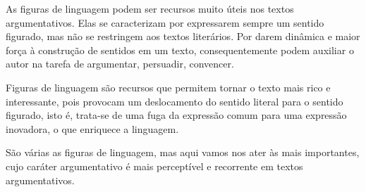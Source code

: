 As figuras de linguagem podem ser recursos muito úteis nos textos
argumentativos. Elas se caracterizam por expressarem sempre um sentido
figurado, mas não se restringem aos textos literários. Por darem
dinâmica e maior força à construção de sentidos em um texto,
consequentemente podem auxiliar o autor na tarefa de argumentar,
persuadir, convencer.

Figuras de linguagem são recursos que permitem tornar o texto mais rico
e interessante, pois provocam um deslocamento do sentido literal para o
sentido figurado, isto é, trata-se de uma fuga da expressão comum para
uma expressão inovadora, o que enriquece a linguagem.

São várias as figuras de linguagem, mas aqui vamos nos ater às mais
importantes, cujo caráter argumentativo é mais perceptível e recorrente
em textos argumentativos.


